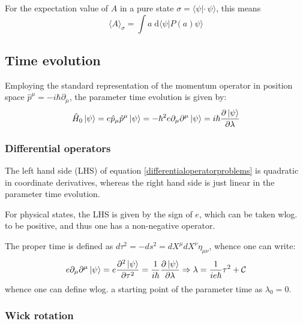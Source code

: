 \documentclass[a4paper,10pt]{article}
\numberwithin{equation}{section}
\begin{document}
For the expectation value of $A$ in a pure state $\sigma=\langle\psi | \cdot \, \psi \rangle$, this means
\begin{equation}
    \langle A \rangle_\sigma = \int a \; \mathrm{d} \langle \psi | P(a) \psi\rangle
\end{equation}
\fi

\subsection{Time evolution}
Employing the standard representation of the momentum operator in position space $\hat{p}^\mu = -i\hbar \partial_\mu$, the parameter time evolution is given by:
\begin{equation}
    \hat{H}_0 \ket{\psi} = e \hat{p}_\mu \hat{p}^\mu \ket{\psi} = - \hbar^2 e \partial_\mu \partial^\mu \ket{\psi}= i\hbar \dfrac{\partial \ket{\psi}}{\partial \lambda}
    \label{differentialoperatorproblems}
\end{equation}

\subsubsection{Differential operators}
The left hand side (LHS) of equation \ref{differentialoperatorproblems} is quadratic in coordinate derivatives, whereas the right hand side is just linear in the parameter time evolution. 



For physical states, the LHS is given by the sign of $e$, which can be taken wlog. to be positive, and thus one has a non-negative operator.




The proper time is defined as $d \tau ^2 = -ds^2 =  dX^\mu dX^\nu \eta_{\mu\nu}$, whence one can write:
\begin{equation}
    e \partial_\mu \partial^\mu \ket{\psi} = e \frac{\partial^2 \ket{\psi}}{\partial \tau^2} =  \frac{1}{i\hbar} \frac{\partial \ket{\psi}}{\partial \lambda} \Rightarrow \lambda = \frac{1}{ie\hbar} \tau^2 + \mathcal{C}
    \label{res:diffoperatorrelation}
\end{equation}
whence one can define wlog. a starting point of the parameter time as $\lambda_0 = 0$.

\subsubsection{Wick rotation}
\end{document}
